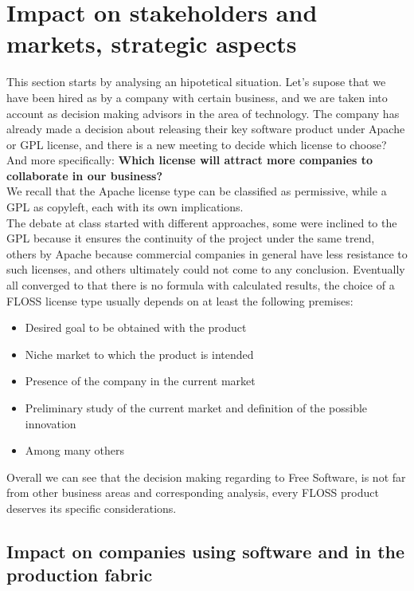 \chapter{Impact on stakeholders and markets, strategic aspects}\label{Chapter 2}

This section starts by analysing an hipotetical situation. Let's supose that we have been hired as by a company with certain business, and we are taken into account as decision making advisors in the area of technology. The company has already made a decision about releasing their key software product under Apache or GPL license, and there is a new meeting to decide which license to choose? And more specifically: \textbf{Which license will attract more companies to collaborate in our business?}\\

We recall that the Apache license type can be classified as permissive, while a GPL as copyleft, each with its own implications. \\

The debate at class started with different approaches, some were inclined to the GPL because it ensures the continuity of the project under the same trend, others by Apache because commercial companies in general have less resistance to such licenses, and others ultimately could not come to any conclusion. Eventually all converged to that there is no formula with calculated results, the choice of a FLOSS license type usually depends on at least the following premises:

\begin{itemize}
\item Desired goal to be obtained with the product
\item Niche market to which the product is intended
\item Presence of the company in the current market
\item Preliminary study of the current market and definition of the possible innovation
\item Among many others
\end{itemize}

Overall we can see that the decision making regarding to Free Software, is not far from other business areas and corresponding analysis, every FLOSS product deserves its specific considerations.


\section{Impact on companies using software and in the production fabric}\label{Section 2.1}

